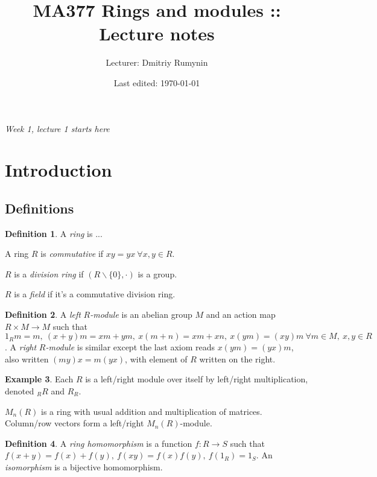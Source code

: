 \documentclass[a4paper]{article}
\title{MA377 Rings and modules :: Lecture notes}
\author{Lecturer: Dmitriy Rumynin}
\date{Last edited: \today}
\theoremstyle{definition}
\newtheorem{defn}{Definition}[subsection]
\newtheorem{example}[defn]{Example}
\begin{document}
\maketitle
\thispagestyle{empty}

\tableofcontents
\thispagestyle{empty}
\newpage
\setcounter{page}{1}

\begin{flushright}
\textit{Week 1, lecture 1 starts here}
\end{flushright}

\section{Introduction}
\subsection{Definitions}
\begin{defn}
A \textit{ring} is ...

A ring $R$ is \textit{commutative} if $xy=yx \ \forall x,y\in R$.

$R$ is a \textit{division ring} if $(R\backslash\{0\},\cdot)$ is a group.

$R$ is a \textit{field} if it's a commutative division ring.
\end{defn}

\begin{defn}
A \textit{left} $R$\textit{-module} is an abelian group $M$ and an action map $R\times M\rightarrow M$ such that $1_Rm=m,\ (x+y)m=xm+ym,\ x(m+n)=xm+xn,\ x(ym)=(xy)m \ \forall m\in M,\ x,y\in R$. A \textit{right} $R$\textit{-module} is similar except the last axiom reads $x(ym)=(yx)m$, also written $(my)x=m(yx)$, with element of $R$ written on the right.
\end{defn}

\begin{example}
Each $R$ is a left/right module over itself by left/right multiplication, denoted $_R R$ and $R_R$.

$M_n(R)$ is a ring with usual addition and multiplication of matrices. Column/row vectors form a left/right $M_n(R)$-module.
\end{example}

\begin{defn}
A \textit{ring homomorphism} is a function $f:R\rightarrow S$ such that $f(x+y)=f(x)+f(y),\ f(xy)=f(x)f(y),\ f(1_R)=1_S$. An \textit{isomorphism} is a bijective homomorphism.
\end{defn}
\end{document}
